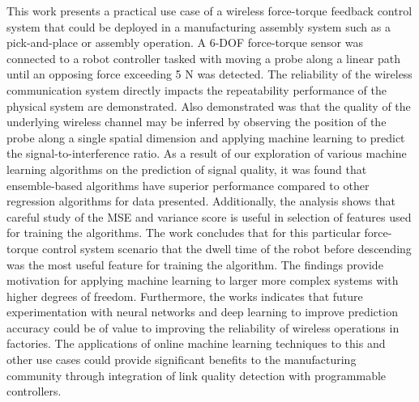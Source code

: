 This work presents a practical use case of a wireless force-torque feedback control system that could be deployed in a manufacturing assembly system such as a pick-and-place or assembly operation.  A 6-DOF force-torque sensor was connected to a robot controller tasked with moving a probe along a linear path until an opposing force exceeding 5 N was detected.  The reliability of the wireless communication system directly impacts the repeatability performance of the physical system are demonstrated.  Also demonstrated was that the quality of the underlying wireless channel may be inferred by observing the position of the probe along a single spatial dimension and applying machine learning to predict the signal-to-interference ratio. As a result of our exploration of various machine learning algorithms on the prediction of signal quality, it was  found that ensemble-based algorithms have superior performance compared to other regression algorithms for data presented.  Additionally, the analysis shows that careful study of the MSE and variance score is useful in selection of features used for training the algorithms. The work concludes that for this particular force-torque control system scenario that the dwell time of the robot before descending was the most useful feature for training the algorithm. The findings provide motivation for applying machine learning to larger more complex systems with higher degrees of freedom. Furthermore, the works indicates that future  experimentation with neural networks and deep learning to improve prediction accuracy could be of value to improving the reliability of wireless operations in factories. The applications of online machine learning techniques to this and other use cases could provide significant benefits to the manufacturing community through integration of link quality detection with programmable controllers.




